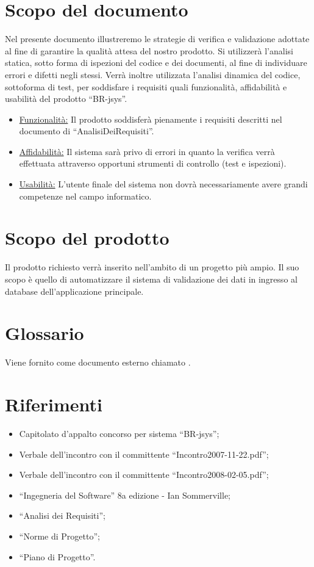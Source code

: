 \documentclass[11pt,titlepage,a4paper]{report}
\begin{document}
\section{Scopo del documento}
Nel presente documento illustreremo le strategie di verifica e validazione adottate al fine di garantire la qualit\`a attesa del nostro prodotto. Si utilizzer\`a l'analisi statica, sotto forma di ispezioni del codice e dei documenti, al fine di individuare errori e difetti negli stessi. Verr\`a inoltre utilizzata l'analisi dinamica del codice, sottoforma di test, per soddisfare i requisiti quali funzionalit\`a, affidabilit\`a e usabilit\`a del prodotto ``BR-jsys''.
\begin{itemize}
\item \underline{Funzionalit\`a:} \newline
Il prodotto soddisfer\`a pienamente i requisiti descritti nel documento di ``AnalisiDeiRequisiti''.
\item \underline{Affidabilit\`a:} \newline
Il sistema sar\`a privo di errori in quanto la verifica verr\`a effettuata attraverso opportuni strumenti di controllo (test e ispezioni).
\item \underline{Usabilit\`a:} \newline
L'utente finale del sistema non dovr\`a necessariamente avere grandi competenze nel campo informatico.
\end{itemize}

\section{Scopo del prodotto}
Il prodotto richiesto verr\`a inserito nell'ambito di un progetto pi\`u ampio. Il suo scopo \`e quello di automatizzare il sistema di validazione dei dati in ingresso al database dell'applicazione principale.

\section{Glossario}
Viene fornito come documento esterno chiamato \Glossario.
\section{Riferimenti}
\begin{itemize}
\item Capitolato d'appalto concorso per sistema ``BR-jsys'';
\item Verbale dell'incontro con il committente ``Incontro2007-11-22.pdf'';
\item Verbale dell'incontro con il committente ``Incontro2008-02-05.pdf'';
\item ``Ingegneria del Software'' 8a edizione - Ian Sommerville;
\item ``Analisi dei Requisiti'';
\item ``Norme di Progetto'';
\item ``Piano di Progetto''.
\end{itemize}
\end{document}
